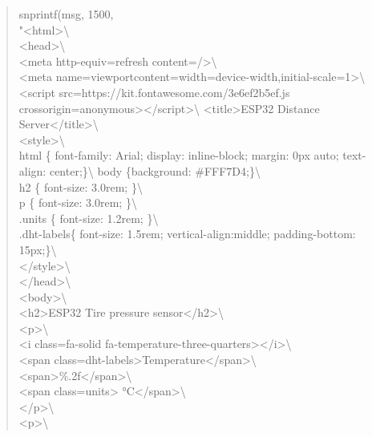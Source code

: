 \documentclass[
]{article}
\begin{document}
\begin{minipage}[b]{\linewidth}\raggedright
\begin{quote}
snprintf(msg, 1500,\\
"\textless html\textgreater\textbackslash{}\\
\textless head\textgreater\textbackslash{}\\
\textless meta http-equiv=\textquotesingle refresh\textquotesingle{}
content=\textquotesingle/\textgreater\textbackslash{}\\
\textless meta name=\textquotesingle viewport\textquotesingle{}content=\textquotesingle width=device-width,initial-scale=1\textquotesingle\textgreater\textbackslash{}\\
\textless script
src=\textquotesingle https://kit.fontawesome.com/3e6ef2b5ef.js\textquotesingle{}
crossorigin=\textquotesingle anonymous\textquotesingle\textgreater\textless/script\textgreater\textbackslash{}
\textless title\textgreater ESP32 Distance
Server\textless/title\textgreater\textbackslash{}\\
\textless style\textgreater\textbackslash{}\\
html \{ font-family: Arial; display: inline-block; margin: 0px auto;
text-align: center;\}\textbackslash{} body \{background:
\#FFF7D4;\}\textbackslash{}\\
h2 \{ font-size: 3.0rem; \}\textbackslash{}\\
p \{ font-size: 3.0rem; \}\textbackslash{}\\
.units \{ font-size: 1.2rem; \}\textbackslash{}\\
.dht-labels\{ font-size: 1.5rem; vertical-align:middle; padding-bottom:
15px;\}\textbackslash{}\\
\textless/style\textgreater\textbackslash{}\\
\textless/head\textgreater\textbackslash{}\\
\textless body\textgreater\textbackslash{}\\
\textless h2\textgreater ESP32 Tire pressure
sensor\textless/h2\textgreater\textbackslash{}\\
\textless p\textgreater\textbackslash{}\\
\textless i class=\textquotesingle fa-solid
fa-temperature-three-quarters\textquotesingle\textgreater\textless/i\textgreater\textbackslash{}\\
\textless span
class=\textquotesingle dht-labels\textquotesingle\textgreater Temperature\textless/span\textgreater\textbackslash{}\\
\textless span\textgreater\%.2f\textless/span\textgreater\textbackslash{}\\
\textless span
class=\textquotesingle units\textquotesingle\textgreater{}
°C\textless/span\textgreater\textbackslash{}\\
\textless/p\textgreater\textbackslash{}\\
\textless p\textgreater\textbackslash{}
\end{quote}\strut
\end{minipage} \\
\end{document}
